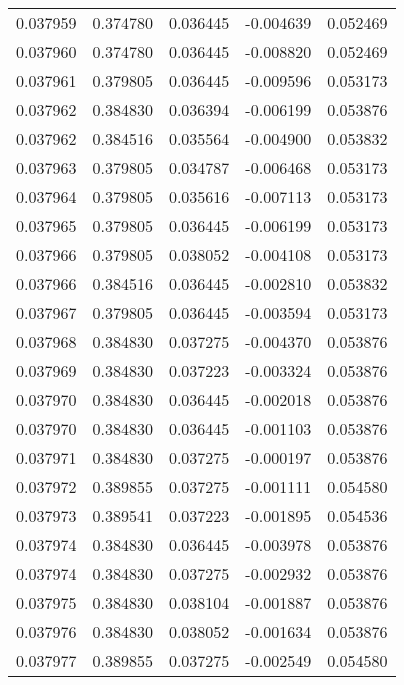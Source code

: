 \begin{tabular}{lrrrr}
0.037959    &  0.374780 &  0.036445 & -0.004639 &             0.052469 \\
0.037960    &  0.374780 &  0.036445 & -0.008820 &             0.052469 \\
0.037961    &  0.379805 &  0.036445 & -0.009596 &             0.053173 \\
0.037962    &  0.384830 &  0.036394 & -0.006199 &             0.053876 \\
0.037962    &  0.384516 &  0.035564 & -0.004900 &             0.053832 \\
0.037963    &  0.379805 &  0.034787 & -0.006468 &             0.053173 \\
0.037964    &  0.379805 &  0.035616 & -0.007113 &             0.053173 \\
0.037965    &  0.379805 &  0.036445 & -0.006199 &             0.053173 \\
0.037966    &  0.379805 &  0.038052 & -0.004108 &             0.053173 \\
0.037966    &  0.384516 &  0.036445 & -0.002810 &             0.053832 \\
0.037967    &  0.379805 &  0.036445 & -0.003594 &             0.053173 \\
0.037968    &  0.384830 &  0.037275 & -0.004370 &             0.053876 \\
0.037969    &  0.384830 &  0.037223 & -0.003324 &             0.053876 \\
0.037970    &  0.384830 &  0.036445 & -0.002018 &             0.053876 \\
0.037970    &  0.384830 &  0.036445 & -0.001103 &             0.053876 \\
0.037971    &  0.384830 &  0.037275 & -0.000197 &             0.053876 \\
0.037972    &  0.389855 &  0.037275 & -0.001111 &             0.054580 \\
0.037973    &  0.389541 &  0.037223 & -0.001895 &             0.054536 \\
0.037974    &  0.384830 &  0.036445 & -0.003978 &             0.053876 \\
0.037974    &  0.384830 &  0.037275 & -0.002932 &             0.053876 \\
0.037975    &  0.384830 &  0.038104 & -0.001887 &             0.053876 \\
0.037976    &  0.384830 &  0.038052 & -0.001634 &             0.053876 \\
0.037977    &  0.389855 &  0.037275 & -0.002549 &             0.054580 \\

\end{tabular}
